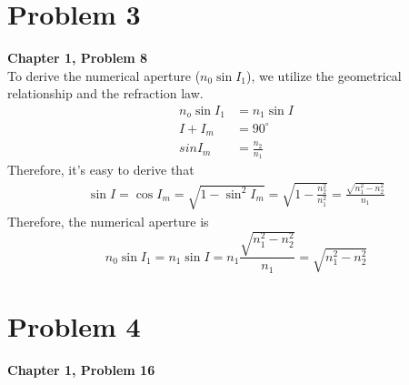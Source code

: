 \documentclass{article}
\begin{document}
\section{Problem 3}
\textbf{Chapter 1, Problem 8}\\
To derive the numerical aperture ($n_0\sin I_1$), we utilize the geometrical relationship and the refraction law.
\begin{align}
    n_o\sin I_1 & = n_1\sin I       \\
    I+I_m       & = 90^\circ        \\
    sin I_m     & = \frac{n_2}{n_1}
\end{align}
Therefore, it's easy to derive that
\begin{align}
    \sin I=\cos I_m=\sqrt{1-\sin^2I_m}=\sqrt{1-\frac{n_2^2}{n_1^2}} = \frac{\sqrt{n_1^2-n_2^2}}{n_1}
\end{align}
Therefore, the numerical aperture is
\begin{equation}
    \boxed{
        n_0\sin I_1 = n_1\sin I = n_1\frac{\sqrt{n_1^2-n_2^2}}{n_1} = \sqrt{n_1^2-n_2^2}}
\end{equation}



\section{Problem 4}
\textbf{Chapter 1, Problem 16}
\end{document}
